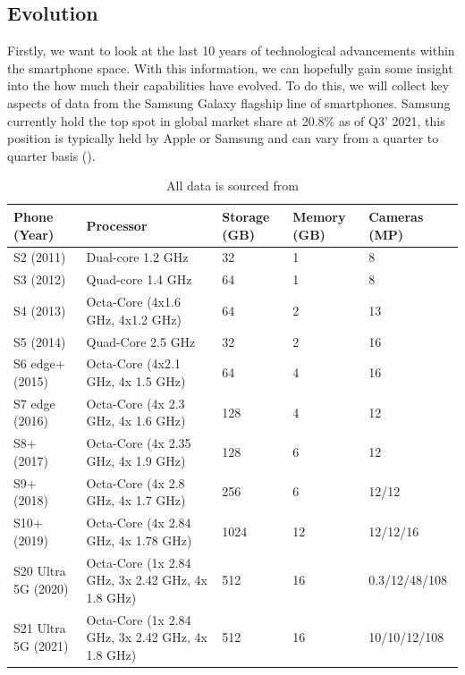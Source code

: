 \documentclass{article}
\begin{document}
\subsection{Evolution}
Firstly, we want to look at the last 10 years of technological advancements within the smartphone space. 
With this information, we can hopefully gain some insight into the how much their capabilities have evolved. To do this,
 we will collect key aspects of data from the Samsung Galaxy flagship line of smartphones. Samsung currently hold the 
 top spot in global market share at 20.8\% as of Q3’ 2021, this position is typically held by Apple or Samsung and can 
 vary from a quarter to quarter basis (\cite{odea2021}).
 \newpage
\begin{table}[h!]
    \centering
    \begin{tabular}{ |m{2.5cm}|m{2.7cm}|m{1cm}|m{1.2cm}|m{2.5cm}| }
        \hline
        Phone (Year) & Processor & Storage (GB) & Memory (GB) & Cameras (MP) \\
        \hline
        \hline
        S2 (2011) & Dual-core 1.2 GHz & 32 & 1 & 8 \\
        \hline
        S3 (2012) & Quad-core 1.4 GHz & 64 & 1 & 8 \\
        \hline
        S4 (2013) & Octa-Core (4x1.6 GHz, 4x1.2 GHz) & 64 & 2 & 13 \\
        \hline
        S5 (2014) & Quad-Core 2.5 GHz & 32 & 2 & 16 \\
        \hline
        S6 edge+ (2015) & Octa-Core (4x2.1 GHz, 4x 1.5 GHz) & 64 & 4 & 16 \\
        \hline
        S7 edge (2016) & Octa-Core (4x 2.3 GHz, 4x 1.6 GHz) & 128 &	4 &	12 \\
        \hline
        S8+ (2017) & Octa-Core (4x 2.35 GHz, 4x 1.9 GHz) & 128 & 6 & 12 \\
        \hline
        S9+ (2018) & Octa-Core (4x 2.8 GHz, 4x 1.7 GHz) & 256 &	6 &	12/12 \\
        \hline
        S10+ (2019) & Octa-Core (4x 2.84 GHz, 4x 1.78 GHz) & 1024 &	12 & 12/12/16 \\
        \hline
        S20 Ultra 5G (2020) & Octa-Core (1x 2.84 GHz, 3x 2.42 GHz, 4x 1.8 GHz) & 512 & 16 & 0.3/12/48/108 \\
        \hline
        S21 Ultra 5G (2021) & Octa-Core (1x 2.84 GHz, 3x 2.42 GHz, 4x 1.8 GHz) & 512 & 16 &	10/10/12/108 \\
        \hline
    \end{tabular}
    \caption{All data is sourced from \cite{gsm}}
    \label{table:1}
\end{table}
\end{document}
